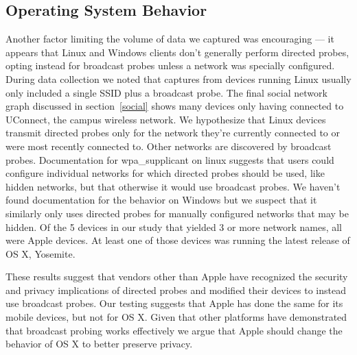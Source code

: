 \documentclass[letterpaper,twocolumn,10pt]{article}
\begin{document}
\subsection{Operating System Behavior}
Another factor limiting the volume of data we captured was encouraging --- it appears that Linux and Windows clients don't generally perform directed probes, opting instead for broadcast probes unless a network was specially configured. During data collection we noted that captures from devices running Linux usually only included a single SSID plus a broadcast probe. The final social network graph discussed in section~\ref{social} shows many devices only having connected to UConnect, the campus wireless network. We hypothesize that Linux devices transmit directed probes only for the network they're currently connected to or were most recently connected to. Other networks are discovered by broadcast probes. Documentation for wpa\_supplicant on linux suggests that users could configure individual networks for which directed probes should be used, like hidden networks, but that otherwise it would use broadcast probes. We haven't found documentation for the behavior on Windows but we suspect that it similarly only uses directed probes for manually configured networks that may be hidden. Of the 5 devices in our study that yielded 3 or more network names, all were Apple devices. At least one of those devices was running the latest release of OS X, Yosemite.

These results suggest that vendors other than Apple have recognized the security and privacy implications of directed probes and modified their devices to instead use broadcast probes. Our testing suggests that Apple has done the same for its mobile devices, but not for OS X. Given that other platforms have demonstrated that broadcast probing works effectively we argue that Apple should change the behavior of OS X to better preserve privacy.
\end{document}
